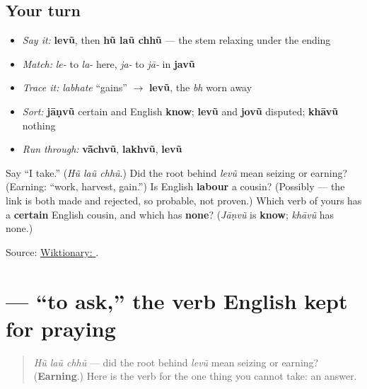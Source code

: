 \subsection*{Your turn}
\begin{itemize}
\raggedright
  \item \emph{Say it:} \textbf{levũ}, then \textbf{hũ laũ chhũ} — the stem relaxing under the ending
  \item \emph{Match:} \emph{le-} to \emph{la-} here, \emph{ja-} to \emph{jā-} in \textbf{javũ}
  \item \emph{Trace it:} \emph{labhate} \textquotedblleft{}gains\textquotedblright{} $\to$ \textbf{levũ}, the \emph{bh} worn away
  \item \emph{Sort:} \textbf{jāṇvũ} certain and English \textbf{know}; \textbf{levũ} and \textbf{jovũ} disputed; \textbf{khāvũ} nothing
  \item \emph{Run through:} \textbf{vā̃chvũ}, \textbf{lakhvũ}, \textbf{levũ}
\end{itemize}

\begin{tcolorbox}[breakable,colback=teal!4,colframe=teal!35!black,title={Before you move on}]
Say \textquotedblleft{}I take.\textquotedblright{} (\emph{Hũ laũ chhũ}.) Did the root behind \emph{levũ} mean seizing or earning? (Earning: \textquotedblleft{}work, harvest, gain.\textquotedblright{}) Is English \textbf{labour} a cousin? (Possibly — the link is both made and rejected, so probable, not proven.) Which verb of yours has a \textbf{certain} English cousin, and which has \textbf{none}? (\emph{Jāṇvũ} is \textbf{know}; \emph{khāvũ} has none.)

Source: \href{https://en.wiktionary.org/wiki/\%E0\%AA\%B2\%E0\%AB\%87\%E0\%AA\%B5\%E0\%AB\%81\%E0\%AA\%82}{Wiktionary: }.
\end{tcolorbox}
\section[pūchhvũ]{ — \textquotedblleft{}to ask,\textquotedblright{} the verb English kept for praying}

\label{lesson:GU-C09-puchhvun}



\begin{quote}
\emph{Hũ laũ chhũ} — did the root behind \emph{levũ} mean seizing or earning? (\textbf{Earning}.) Here is the verb for the one thing you cannot take: an answer.
\end{quote}


